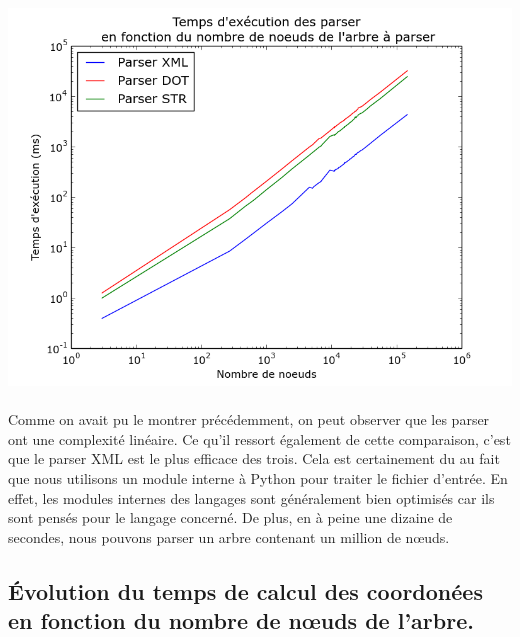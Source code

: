 \begin{center}

\includegraphics[width=\columnwidth]{execTimeParsers}

\end{center}

\paragraph{} Comme on avait pu le montrer précédemment, on peut observer que les parser ont une complexité linéaire. Ce qu'il ressort également de cette comparaison, c'est que le parser XML est le plus efficace des trois. Cela est certainement du au fait que nous utilisons un module interne à Python pour traiter le fichier d'entrée. En effet, les modules internes des langages sont généralement bien optimisés car ils sont pensés pour le langage concerné. De plus, en à peine une dizaine de secondes, nous pouvons parser un arbre contenant un million de n\oe uds.

	\subsection{Évolution du temps de calcul des coordonées en fonction du nombre de n\oe uds de l'arbre.}
	
